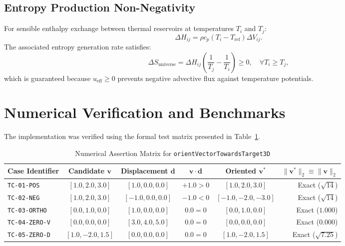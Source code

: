 \documentclass[11pt,a4paper]{article}
\theoremstyle{plain}
\theoremstyle{definition}
\begin{document}
\subsection{Entropy Production Non-Negativity}
For sensible enthalpy exchange between thermal reservoirs at temperatures $T_i$ and $T_j$:
\begin{equation}
    \Delta H_{ij} = \rho c_p (T_i - T_{\text{ref}}) \Delta V_{ij}.
\end{equation}
The associated entropy generation rate satisfies:
\begin{equation}
    \Delta S_{\text{universe}} = \Delta H_{ij} \left( \frac{1}{T_j} - \frac{1}{T_i} \right) \ge 0, \quad \forall T_i \ge T_j,
\end{equation}
which is guaranteed because $u_{\text{eff}} \ge 0$ prevents negative advective flux against temperature potentials.

\section{Numerical Verification and Benchmarks}
The implementation was verified using the formal test matrix presented in Table~\ref{tab:test_matrix}.

\begin{table}[htbp]
\centering
\small
\caption{Numerical Assertion Matrix for \texttt{orientVectorTowardsTarget3D}}
\label{tab:test_matrix}
\begin{tabular}{@{}lccccr@{}}
\toprule
\textbf{Case Identifier} & \textbf{Candidate $\mathbf{v}$} & \textbf{Displacement $\mathbf{d}$} & $\mathbf{v} \cdot \mathbf{d}$ & \textbf{Oriented $\mathbf{v}^*$} & $\|\mathbf{v}^*\|_2 \equiv \|\mathbf{v}\|_2$ \\
\midrule
\texttt{TC-01-POS}   & $[1.0, 2.0, 3.0]$   & $[1.0, 0.0, 0.0]$   & $+1.0 > 0$  & $[1.0, 2.0, 3.0]$   & Exact ($\sqrt{14}$) \\
\texttt{TC-02-NEG}   & $[1.0, 2.0, 3.0]$   & $[-1.0, 0.0, 0.0]$  & $-1.0 < 0$  & $[-1.0, -2.0, -3.0]$& Exact ($\sqrt{14}$) \\
\texttt{TC-03-ORTHO} & $[0.0, 1.0, 0.0]$   & $[1.0, 0.0, 0.0]$   & $0.0 = 0$   & $[0.0, 1.0, 0.0]$   & Exact ($1.000$) \\
\texttt{TC-04-ZERO-V}& $[0.0, 0.0, 0.0]$   & $[3.0, 4.0, 5.0]$   & $0.0 = 0$   & $[0.0, 0.0, 0.0]$   & Exact ($0.000$) \\
\texttt{TC-05-ZERO-D}& $[1.0, -2.0, 1.5]$  & $[0.0, 0.0, 0.0]$   & $0.0 = 0$   & $[1.0, -2.0, 1.5]$  & Exact ($\sqrt{7.25}$) \\
\bottomrule
\end{tabular}
\end{table}
\end{document}
